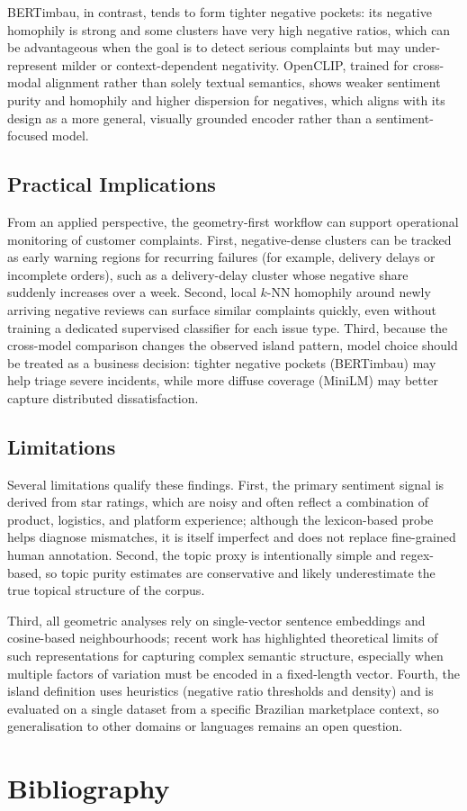 \documentclass[a4paper,11pt]{article}
\begin{document}
BERTimbau, in contrast, tends to form tighter negative pockets: its negative homophily is strong and some clusters have very high negative ratios, which can be advantageous when the goal is to detect serious complaints but may under-represent milder or context-dependent negativity. 
OpenCLIP, trained for cross-modal alignment rather than solely textual semantics, shows weaker sentiment purity and homophily and higher dispersion for negatives, which aligns with its design as a more general, visually grounded encoder rather than a sentiment-focused model.

\subsection{Practical Implications}

From an applied perspective, the geometry-first workflow can support operational monitoring of customer complaints. 
First, negative-dense clusters can be tracked as early warning regions for recurring failures (for example, delivery delays or incomplete orders), such as a delivery-delay cluster whose negative share suddenly increases over a week. 
Second, local $k$-NN homophily around newly arriving negative reviews can surface similar complaints quickly, even without training a dedicated supervised classifier for each issue type. 
Third, because the cross-model comparison changes the observed island pattern, model choice should be treated as a business decision: tighter negative pockets (BERTimbau) may help triage severe incidents, while more diffuse coverage (MiniLM) may better capture distributed dissatisfaction.

\subsection{Limitations}

Several limitations qualify these findings. 
First, the primary sentiment signal is derived from star ratings, which are noisy and often reflect a combination of product, logistics, and platform experience; although the lexicon-based probe helps diagnose mismatches, it is itself imperfect and does not replace fine-grained human annotation. 
Second, the topic proxy is intentionally simple and regex-based, so topic purity estimates are conservative and likely underestimate the true topical structure of the corpus.

Third, all geometric analyses rely on single-vector sentence embeddings and cosine-based neighbourhoods; recent work has highlighted theoretical limits of such representations for capturing complex semantic structure, especially when multiple factors of variation must be encoded in a fixed-length vector. 
Fourth, the island definition uses heuristics (negative ratio thresholds and density) and is evaluated on a single dataset from a specific Brazilian marketplace context, so generalisation to other domains or languages remains an open question.

\clearpage
\section{Bibliography}
\printbibliography

\clearpage
\section*{}
\thispagestyle{empty}
\phantom{}
\end{document}
